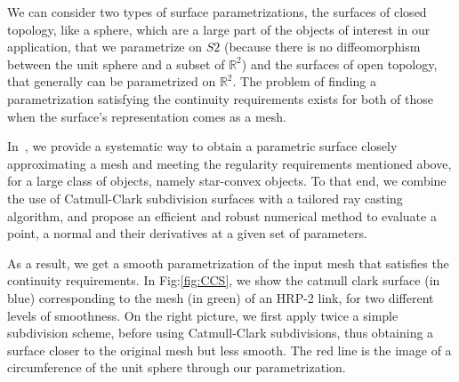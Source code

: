 We can consider two types of surface parametrizations, the surfaces of closed topology, like a sphere, which are a large part of the objects of interest in our application, that we parametrize on $S2$ (because there is no diffeomorphism between the unit sphere and a subset of $\mathbb{R}^2$) and the surfaces of open topology, that generally can be parametrized on $\mathbb{R}^2$.
The problem of finding a parametrization satisfying the continuity requirements exists for both of those when the surface's representation comes as a mesh.

In~\cite{escande:icra:2016}, we provide a systematic way to obtain a parametric surface closely approximating a mesh and meeting the regularity requirements mentioned above, for a large class of objects, namely star-convex objects.
To that end, we combine the use of Catmull-Clark subdivision surfaces with a tailored ray casting algorithm, and propose an efficient and robust numerical method to evaluate a point, a normal and their derivatives at a given set of parameters.

As a result, we get a smooth parametrization of the input mesh that satisfies the continuity requirements.
In Fig:\ref{fig:CCS}, we show the catmull clark surface (in blue) corresponding to the mesh (in green) of an HRP-2 link, for two different levels of smoothness.
On the right picture, we first apply twice a simple subdivision scheme, before using Catmull-Clark subdivisions, thus obtaining a surface closer to the original mesh but less smooth.
The red line is the image of a circumference of the unit sphere through our parametrization.

